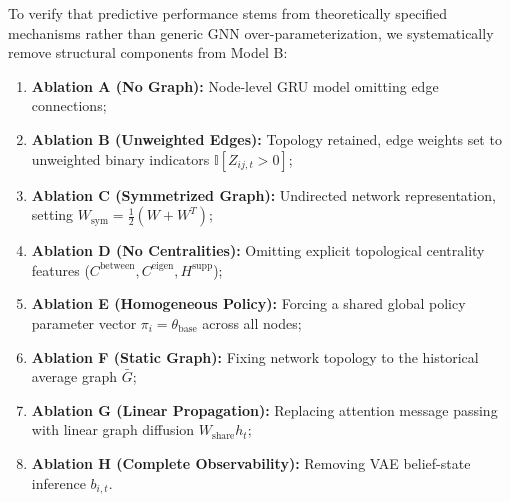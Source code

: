 \documentclass[11pt,a4paper]{article}
\newcommand{\I}{\mathbb{I}}
\begin{document}
To verify that predictive performance stems from theoretically specified mechanisms rather than generic GNN over-parameterization, we systematically remove structural components from Model B:
\begin{enumerate}
    \item \textbf{Ablation A (No Graph):} Node-level GRU model omitting edge connections;
    \item \textbf{Ablation B (Unweighted Edges):} Topology retained, edge weights set to unweighted binary indicators $\I[Z_{ij,t} > 0]$;
    \item \textbf{Ablation C (Symmetrized Graph):} Undirected network representation, setting $W_{\text{sym}} = \frac{1}{2}(W + W^T)$;
    \item \textbf{Ablation D (No Centralities):} Omitting explicit topological centrality features ($C^{\text{between}}, C^{\text{eigen}}, H^{\text{supp}}$);
    \item \textbf{Ablation E (Homogeneous Policy):} Forcing a shared global policy parameter vector $\pi_i = \theta_{\text{base}}$ across all nodes;
    \item \textbf{Ablation F (Static Graph):} Fixing network topology to the historical average graph $\bar{G}$;
    \item \textbf{Ablation G (Linear Propagation):} Replacing attention message passing with linear graph diffusion $W_{\text{share}} h_t$;
    \item \textbf{Ablation H (Complete Observability):} Removing VAE belief-state inference $b_{i,t}$.
\end{enumerate}
\end{document}
